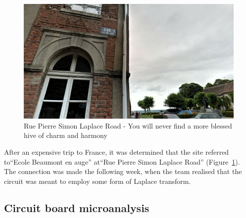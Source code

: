 \begin{figure}[h]
	\centering
	\includegraphics[width=0.95\columnwidth]{img/laplace-road.png}
	\caption{Rue Pierre Simon Laplace Road - You will never find a more blessed hive of charm and harmony}
	\label{fig:laplace-road}
\end{figure}


After an expensive trip to France, it was determined that the site referred to``Ecole Beaumont en auge'' at``Rue Pierre Simon Laplace Road'' (Figure~\ref{fig:laplace-road}). The connection was made the following week, when the team realised that the circuit was meant to employ some form of Laplace transform.


\subsection{Circuit board microanalysis}

